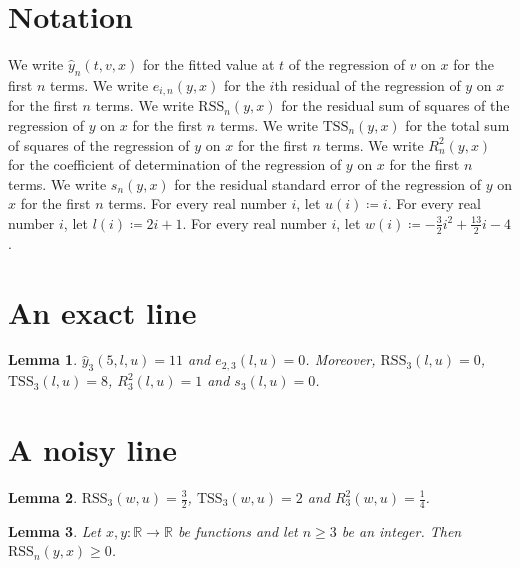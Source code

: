 \documentclass{article}
\newtheorem{lemma}{Lemma}
\begin{document}
\section{Notation}

We write $\hat y_n(t,v,x)$ for the fitted value at $t$ of the regression of $v$ on $x$ for the first $n$ terms.
We write $e_{i,n}(y,x)$ for the $i$th residual of the regression of $y$ on $x$ for the first $n$ terms.
We write $\mathrm{RSS}_n(y,x)$ for the residual sum of squares of the regression of $y$ on $x$ for the first $n$ terms.
We write $\mathrm{TSS}_n(y,x)$ for the total sum of squares of the regression of $y$ on $x$ for the first $n$ terms.
We write $R^2_n(y,x)$ for the coefficient of determination of the regression of $y$ on $x$ for the first $n$ terms.
We write $s_n(y,x)$ for the residual standard error of the regression of $y$ on $x$ for the first $n$ terms.
For every real number $i$, let $u(i)\coloneqq i$.
For every real number $i$, let $l(i)\coloneqq 2i+1$.
For every real number $i$, let $w(i)\coloneqq -\frac32 i^2+\frac{13}{2}i-4$.

\section{An exact line}

\begin{lemma}\label{exact}
$\hat y_3(5,l,u)=11$ and $e_{2,3}(l,u)=0$. Moreover, $\mathrm{RSS}_3(l,u)=0$, $\mathrm{TSS}_3(l,u)=8$, $R^2_3(l,u)=1$ and $s_3(l,u)=0$.
\end{lemma}

\section{A noisy line}

\begin{lemma}\label{noisy}
$\mathrm{RSS}_3(w,u)=\frac32$, $\mathrm{TSS}_3(w,u)=2$ and $R^2_3(w,u)=\frac14$.
\end{lemma}

\begin{lemma}\label{range}
Let $x,y:\mathbb{R}\to\mathbb{R}$ be functions and let $n\ge3$ be an integer. Then $\mathrm{RSS}_n(y,x)\ge0$.
\end{lemma}
\end{document}
